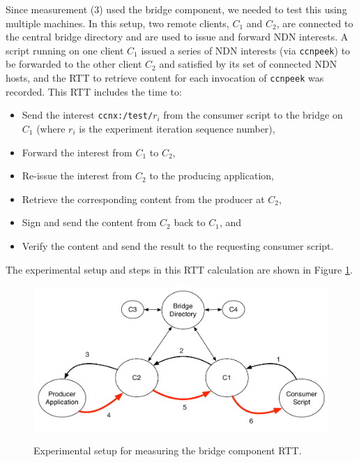 Since measurement (3) used the bridge component, we needed to test this using multiple machines. In this setup, two remote clients, $C_1$ and $C_2$, are connected to the central bridge directory and are used to issue and forward NDN interests. A script running on one client $C_1$ issued a series of NDN interests (via {\tt ccnpeek}) to be forwarded to the other client $C_2$ and satisfied by its set of connected NDN hosts, and the RTT to retrieve content for each invocation of {\tt ccnpeek} was recorded. This RTT includes the time to:
\begin{itemize} 
	\item Send the interest {\tt ccnx:/test/$r_i$} from the consumer script to the bridge on $C_1$ (where $r_i$ is the experiment iteration sequence number),
	\item Forward the interest from $C_1$ to $C_2$, 
	\item Re-issue the interest from $C_2$ to the producing application, 
	\item Retrieve the corresponding content from the producer at $C_2$,
	\item Sign and send the content from $C_2$ back to $C_1$, and
	\item Verify the content and send the result to the requesting consumer script.
\end{itemize}
The experimental setup and steps in this RTT calculation are shown in Figure \ref{fig:exp-bridge}.

\begin{figure}
\begin{center}
\includegraphics[scale=0.4]{./images/experiment.pdf}
\label{fig:exp-bridge}
\caption{Experimental setup for measuring the bridge component RTT.}
\end{center}
\end{figure}

